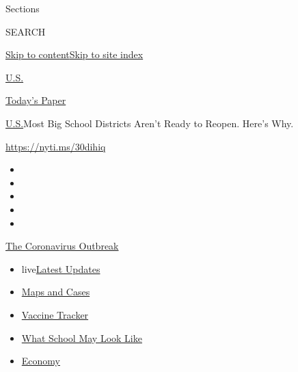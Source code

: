 Sections

SEARCH

\protect\hyperlink{site-content}{Skip to
content}\protect\hyperlink{site-index}{Skip to site index}

\href{https://www.nytimes.com/section/us}{U.S.}

\href{https://myaccount.nytimes.com/auth/login?response_type=cookie\&client_id=vi}{}

\href{https://www.nytimes.com/section/todayspaper}{Today's Paper}

\href{/section/us}{U.S.}\textbar{}Most Big School Districts Aren't Ready
to Reopen. Here's Why.

\url{https://nyti.ms/30dihiq}

\begin{itemize}
\item
\item
\item
\item
\item
\end{itemize}

\href{https://www.nytimes.com/news-event/coronavirus?action=click\&pgtype=Article\&state=default\&region=TOP_BANNER\&context=storylines_menu}{The
Coronavirus Outbreak}

\begin{itemize}
\tightlist
\item
  live\href{https://www.nytimes.com/2020/08/02/world/coronavirus-updates.html?action=click\&pgtype=Article\&state=default\&region=TOP_BANNER\&context=storylines_menu}{Latest
  Updates}
\item
  \href{https://www.nytimes.com/interactive/2020/us/coronavirus-us-cases.html?action=click\&pgtype=Article\&state=default\&region=TOP_BANNER\&context=storylines_menu}{Maps
  and Cases}
\item
  \href{https://www.nytimes.com/interactive/2020/science/coronavirus-vaccine-tracker.html?action=click\&pgtype=Article\&state=default\&region=TOP_BANNER\&context=storylines_menu}{Vaccine
  Tracker}
\item
  \href{https://www.nytimes.com/interactive/2020/07/29/us/schools-reopening-coronavirus.html?action=click\&pgtype=Article\&state=default\&region=TOP_BANNER\&context=storylines_menu}{What
  School May Look Like}
\item
  \href{https://www.nytimes.com/live/2020/07/31/business/stock-market-today-coronavirus?action=click\&pgtype=Article\&state=default\&region=TOP_BANNER\&context=storylines_menu}{Economy}
\end{itemize}

